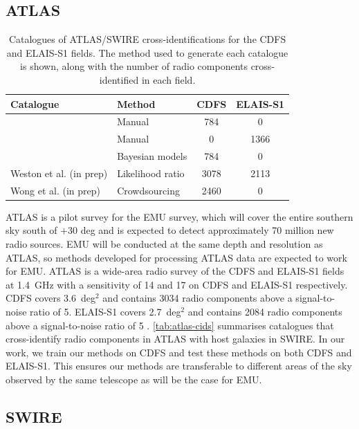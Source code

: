 \documentclass[fleqn,usenatbib,usedcolumn]{mnras}
\newcommand{\jansky}{\text{Jy}}
\begin{document}
  \subsection{ATLAS}\label{sec:atlas}
    \begin{table}
      \caption{Catalogues of ATLAS/SWIRE cross-identifications for the CDFS
        and ELAIS-S1 fields. The method used to generate each catalogue is
        shown, along with the number of radio components cross-identified in each
        field.}
      \label{tab:atlas-cids}
      \begin{tabular}{llcc}
        \hline
        Catalogue & Method & CDFS & ELAIS-S1\\
        \hline
        \citet{norris06} & Manual & 784 & 0\\
        \citet{middelberg08} & Manual & 0 & 1366\\
        \citet{fan15} & Bayesian models & 784 & 0\\
        Weston et al. (in prep) & Likelihood ratio & 3078 & 2113\\
        Wong et al. (in prep) & Crowdsourcing & 2460 & 0 \\
        \hline
      \end{tabular}
    \end{table}

    ATLAS is a pilot survey for the EMU \citep{norris11} survey, which will
    cover the entire southern sky south of $+30$ deg and is expected to
    detect approximately 70 million new radio sources. EMU will be conducted
    at the same depth and resolution as ATLAS, so methods developed for
    processing ATLAS data are expected to work for EMU. ATLAS is a wide-area
    radio survey of the CDFS and ELAIS-S1 fields at 1.4~GHz with a sensitivity
    of 14 and \unit{17}{\micro\jansky} on CDFS and ELAIS-S1 respectively. CDFS
    covers 3.6~deg$^2$ and contains 3034 radio components above a signal-to-noise ratio of 5.
    ELAIS-S1 covers 2.7~deg$^2$ and contains 2084 radio components above a signal-to-noise ratio of 5 \citep{franzen15}. \autoref{tab:atlas-cids} summarises
    catalogues that cross-identify radio components in ATLAS with host
    galaxies in SWIRE. In our work, we train our methods on CDFS and test these methods on both CDFS and ELAIS-S1.  This ensures our methods are transferable to different areas of the sky observed by the same telescope as will be the case for EMU.

  \subsection{SWIRE}\label{sec:swire}
\end{document}
